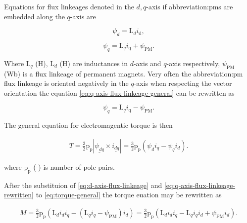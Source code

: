 \documentclass[a4paper, twoside, 11pt]{article}
\begin{document}
        Equations for flux linkeages denoted in the $d,q$-axis if \gls{abbreviation:pm}s are embedded along the $q$-axis are

        \begin{equation}\label{eq:d-axis-flux-linkeage}
            \psi_d = \text{L}_d i_\text{d},
        \end{equation}

        \begin{equation}\label{eq:q-axis-flux-linkeage-general}
            \psi_q = \text{L}_q i_\text{q} + \psi_\text{PM}.
        \end{equation}

        Where $\text{L}_q$ (H), $\text{L}_d$ (H) are inductances in $d$-axis and $q$-axis respectively, $\psi_\text{PM}$ (Wb) is a flux linkeage of permanent magnets. Very often the \gls{abbreviation:pm} flux linkeage is oriented negatively in the $q$-axis when respecting the vector orientation the equation \ref{eq:q-axis-flux-linkeage-general} can be rewritten as

        \begin{equation}\label{eq:q-axis-flux-linkeage-rewritten}
            \psi_q = \text{L}_q i_\text{q} - \psi_\text{PM}.
        \end{equation}
        
        The general equation for electromagentic torque is then

        \begin{equation}\label{eq:torque-general}
            \begin{gathered}
                T = \frac{3}{2} \text{p}_\text{p} | \underline{\psi_{dq}} \times \underline{i_{dq}} | = \frac{3}{2} \text{p}_\text{p} (\psi_d i_q - \psi_q i_d).
            \end{gathered}
        \end{equation}

        where $\text{p}_\text{p}$ (-) is number of pole pairs.\par

        After the substituion of \ref{eq:d-axis-flux-linkeage} and \ref{eq:q-axis-flux-linkeage-rewritten} to \ref{eq:torque-general} the torque euation may be rewritten as


        \begin{equation}\label{eq:torque-pmsynrelm}
            \begin{gathered}
                M = \frac{3}{2} \text{p}_\text{p} (\text{L}_d i_d i_q - (\text{L}_q i_q -\psi_\text{PM}) i_d) = \frac{3}{2} \text{p}_\text{p} (\text{L}_d i_d i_q - \text{L}_q i_q i_d + \psi_\text{PM} i_d).
            \end{gathered}
        \end{equation}
\end{document}
